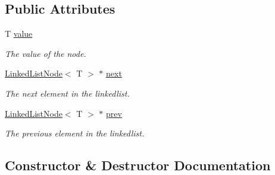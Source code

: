 \subsection*{Public Attributes}
\begin{DoxyCompactItemize}
\item 
\mbox{\label{classutil_1_1LinkedListNode_a190922a539e799d955b40673f8aa79bc}} 
T \hyperlink{classutil_1_1LinkedListNode_a190922a539e799d955b40673f8aa79bc}{value}
\begin{DoxyCompactList}\small\item\em The value of the node. \end{DoxyCompactList}\item 
\mbox{\label{classutil_1_1LinkedListNode_a293bf69c48417a2487d2c479ab74f4d0}} 
\hyperlink{classutil_1_1LinkedListNode}{Linked\+List\+Node}$<$ T $>$ $\ast$ \hyperlink{classutil_1_1LinkedListNode_a293bf69c48417a2487d2c479ab74f4d0}{next}
\begin{DoxyCompactList}\small\item\em The next element in the linkedlist. \end{DoxyCompactList}\item 
\mbox{\label{classutil_1_1LinkedListNode_acdb98170eeeeb05c187a8aff5f613b20}} 
\hyperlink{classutil_1_1LinkedListNode}{Linked\+List\+Node}$<$ T $>$ $\ast$ \hyperlink{classutil_1_1LinkedListNode_acdb98170eeeeb05c187a8aff5f613b20}{prev}
\begin{DoxyCompactList}\small\item\em The previous element in the linkedlist. \end{DoxyCompactList}\end{DoxyCompactItemize}


\subsection{Constructor \& Destructor Documentation}
\mbox{\label{classutil_1_1LinkedListNode_a7bb8008f6d5a04ed6229c7f3d241d442}} 

